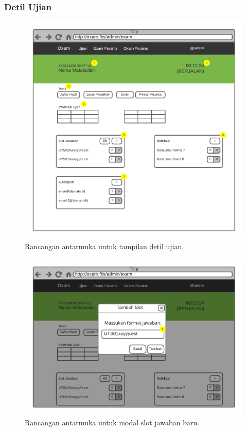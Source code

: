 \subsubsection{Detil Ujian}
    \begin{figure}
        \centering
        \includegraphics[width=0.75\paperwidth]{Gambar/mockups/Mockup--Admin - Exam Details.pdf}
        \caption{Rancangan antarmuka untuk tampilan detil ujian.}
        \label{fig:mockup_admin_exam_details}
    \end{figure}
    
    \begin{figure}
        \centering
        \includegraphics[width=0.75\paperwidth]{Gambar/mockups/Mockup--Admin - Slot Jawaban.pdf}
        \caption{Rancangan antarmuka untuk modal slot jawaban baru.}
        \label{fig:mockup_admin_exam_det_answer_slot}
    \end{figure}
    
